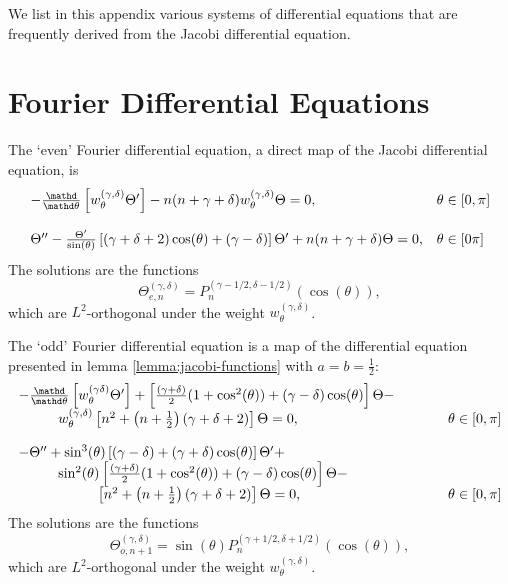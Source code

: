 \label{app:odes}We list in this appendix various systems of differential
equations that are frequently derived from the Jacobi differential equation.

\section{Fourier Differential Equations}

The `even' Fourier differential equation, a direct map of the Jacobi
differential equation, is
\begin{equation}
  \label{eq:fourier-even-odes} \begin{array}{ll}
    - \frac{\mathd}{\mathd \theta}  \left[ w_{\theta}^{(\gamma, \delta)}
    \Theta' \right] - n (n + \gamma + \delta) w_{\theta}^{(\gamma, \delta)}
    \Theta = 0, & \theta \in [0, \pi]\\
    & \\
    \Theta'' - \frac{\Theta'}{\sin (\theta)} \left[ (\gamma + \delta + 2) \cos
    (\theta) + (\gamma - \delta) \right] \Theta' + n (n + \gamma + \delta)
    \Theta = 0, & \theta \in [0 \pi]
  \end{array}
\end{equation}
The solutions are the functions
\[ \Theta_{e, n}^{(\gamma, \delta)} = P_n^{(\gamma - 1 / 2, \delta - 1 / 2)}
   (\cos (\theta)), \]
which are $L^2$-orthogonal under the weight $w_{\theta}^{(\gamma, \delta)}$.

The `odd' Fourier differential equation is a map of the differential equation
presented in lemma \ref{lemma:jacobi-functions} with $a = b = \frac{1}{2}$:
\begin{equation}
  \label{eq:fourier-odd-odes} \begin{array}{lll}
    - \frac{\mathd}{\mathd \theta}  \left[ w_{\theta}^{(\gamma \delta)}
    \Theta' \right] + \left[ \frac{(\gamma + \delta)}{2} (1 + \cos^2 (\theta))
    + (\gamma - \delta) \cos (\theta) \right] \Theta -  \hspace{1cm} & \\
    \hspace{1cm} w_{\theta}^{(\gamma, \delta)}  \left[ n^2 + \left( n + \frac{1}{2} \right)
    (\gamma + \delta + 2) \right] \Theta = 0,  & \theta \in [0, \pi]\\
    & \\
    - \Theta'' + \sin^3 (\theta) \left[ (\gamma - \delta) + (\gamma + \delta)
    \cos (\theta) \right] \Theta' + & \\
    \hspace{1cm}\sin^2 (\theta) \left[ \frac{(\gamma + \delta)}{2} (1 + \cos^2 (\theta)) +
    (\gamma - \delta) \cos (\theta) \right] \Theta - & \\
    \hspace{2cm} \left[ n^2 + \left( n +
    \frac{1}{2} \right) (\gamma + \delta + 2) \right] \Theta = 0, &  \theta
    \in [0, \pi]
  \end{array}
\end{equation}
The solutions are the functions
\[ \Theta_{o, n + 1}^{(\gamma, \delta)} = \sin (\theta) P_n^{(\gamma + 1 / 2,
   \delta + 1 / 2)} (\cos (\theta)), \]
which are $L^2$-orthogonal under the weight $w_{\theta}^{(\gamma, \delta)}$.

